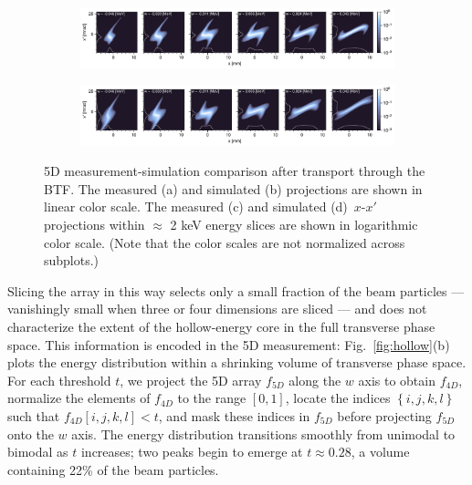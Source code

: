 \documentclass[letterpaper,
               nospread,
               biblatex,
              ]{jacow}
\begin{document}
\begin{figure}[!t]
\begin{subfigure}{0.48\textwidth}
        \caption{}
        \label{fig:VS34_b}
    \end{subfigure}
    \vfill
    \vfill
    \begin{subfigure}{\textwidth}
        \includegraphics[width=\textwidth]{FRXD3f2c.pdf}
        \caption{}
        \label{fig:VS34_c}
    \end{subfigure}
    \vfill
    \vfill
    \begin{subfigure}{\textwidth}
        \includegraphics[width=\textwidth]{FRXD3f2d.pdf}
        \caption{}
        \label{fig:VS34_d}
    \end{subfigure}
    \caption{5D measurement-simulation comparison after transport through the BTF. The measured (a) and simulated (b) projections are shown in linear color scale. The measured (c) and simulated (d)~$x$-$x'$ projections within $\approx$ 2 keV energy slices are shown in logarithmic color scale. (Note that the color scales are not normalized across subplots.)}
    \label{fig:VS34}
\end{figure}
%

Slicing the array in this way selects only a small fraction of the beam particles — vanishingly small when three or four dimensions are sliced — and does not characterize the extent of the hollow-energy core in the full transverse phase space. This information is encoded in the 5D measurement: Fig.~\ref{fig:hollow}(b) plots the energy distribution within a shrinking volume of transverse phase space. For each threshold $t$, we project the 5D array $f_{5D}$ along the $w$ axis to obtain $f_{4D}$, normalize the elements of $f_{4D}$ to the range $[0, 1]$, locate the indices $\left\{i, j, k, l\right\}$ such that $f_{4D}[i, j, k, l] < t$, and mask these indices in $f_{5D}$ before projecting $f_{5D}$ onto the $w$ axis. The energy distribution transitions smoothly from unimodal to bimodal as $t$ increases; two peaks begin to emerge at $t \approx 0.28$, a volume containing 22\% of the beam particles.
\end{document}
